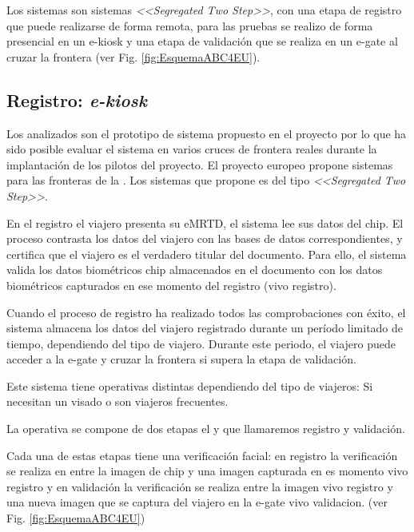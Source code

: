 Los sistemas  son sistemas  \textit{<<Segregated Two Step>>}, con una etapa de registro  que puede realizarse de forma remota, para las pruebas se realizo de forma presencial en un \gls{e-kiosk} y una etapa de validación  que se realiza en un \gls{e-gate} al cruzar la frontera (ver Fig. \ref{fig:EsquemaABC4EU}). 

\subsection{Registro: \textit{e-kiosk}}

\color{blue}Los  analizados son el prototipo de sistema propuesto en el proyecto  por lo que ha sido posible evaluar el sistema en varios cruces de frontera reales durante la implantación de los pilotos del proyecto.
El proyecto europeo  propone sistemas  para las fronteras de la . Los sistemas que propone es del tipo  \textit{<<Segregated Two Step>>}.\color{black}

En el registro el viajero presenta su \Gls{eMRTD}, el sistema lee sus datos del \gls{chip}. El proceso contrasta los datos del viajero con las bases de datos correspondientes, y certifica que el viajero es el verdadero titular del documento. Para ello, el sistema valida los datos biométricos \gls{chip} almacenados en el documento con los datos biométricos capturados en ese momento del registro (\gls{vivo registro}).

Cuando el proceso de registro ha realizado todos las comprobaciones con éxito, el sistema almacena los datos del viajero registrado durante un período limitado de tiempo, dependiendo del tipo de viajero. Durante este periodo, el viajero puede acceder a la \gls{e-gate} y cruzar la frontera si supera la etapa de validación.

\color{blue}Este sistema tiene operativas distintas dependiendo del tipo de viajeros: Si necesitan un visado o son viajeros frecuentes.

La operativa se compone de dos etapas el  y  que llamaremos registro y validación.

Cada una de estas etapas tiene una verificación facial: en registro la verificación se realiza en entre la imagen de \gls{chip} y una imagen capturada en es momento \gls{vivo registro} y en validación la verificación se realiza entre la imagen \gls{vivo registro} y una nueva imagen que se captura del viajero en la \gls{e-gate} \gls{vivo validacion}. (ver Fig. \ref{fig:EsquemaABC4EU})


